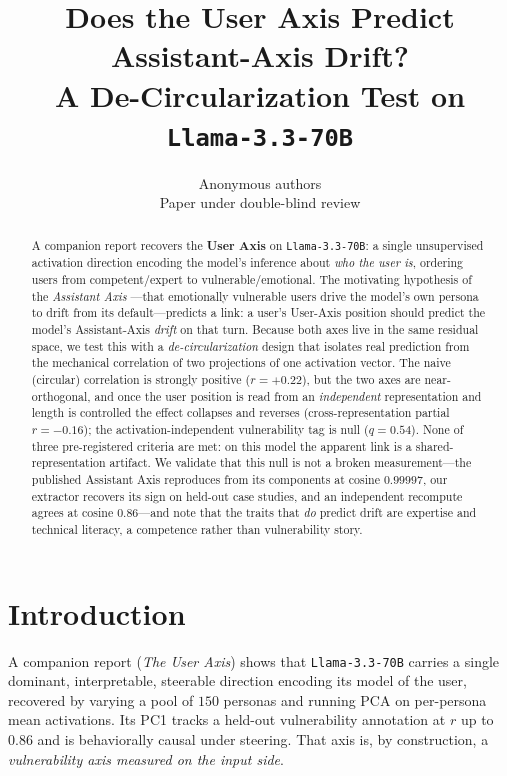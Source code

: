 \documentclass{article}
\title{Does the User Axis Predict Assistant-Axis Drift?\\ A De-Circularization Test on \texttt{Llama-3.3-70B}}
\author{Anonymous authors\\ Paper under double-blind review}
\begin{document}
\maketitle
\begin{abstract}
A companion report recovers the \textbf{User Axis} on \texttt{Llama-3.3-70B}: a single unsupervised activation direction encoding the model's inference about \emph{who the user is}, ordering users from competent/expert to vulnerable/emotional. The motivating hypothesis of the \emph{Assistant Axis} \citep{lu2024assistant}---that emotionally vulnerable users drive the model's own persona to drift from its default---predicts a link: a user's User-Axis position should predict the model's Assistant-Axis \emph{drift} on that turn. Because both axes live in the same residual space, we test this with a \emph{de-circularization} design that isolates real prediction from the mechanical correlation of two projections of one activation vector. The naive (circular) correlation is strongly positive ($r{=}{+}0.22$), but the two axes are near-orthogonal, and once the user position is read from an \emph{independent} representation and length is controlled the effect collapses and reverses (cross-representation partial $r{=}{-}0.16$); the activation-independent vulnerability tag is null ($q{=}0.54$). None of three pre-registered criteria are met: on this model the apparent link is a shared-representation artifact. We validate that this null is not a broken measurement---the published Assistant Axis reproduces from its components at cosine $0.99997$, our extractor recovers its sign on held-out case studies, and an independent recompute agrees at cosine $0.86$---and note that the traits that \emph{do} predict drift are expertise and technical literacy, a competence rather than vulnerability story.
\end{abstract}

\section{Introduction}
A companion report (\emph{The User Axis}) shows that \texttt{Llama-3.3-70B} carries a single dominant, interpretable, steerable direction encoding its model of the user, recovered by varying a pool of $150$ personas and running PCA on per-persona mean activations. Its PC1 tracks a held-out vulnerability annotation at $r$ up to $0.86$ and is behaviorally causal under steering. That axis is, by construction, a \emph{vulnerability axis measured on the input side}.
\end{document}
